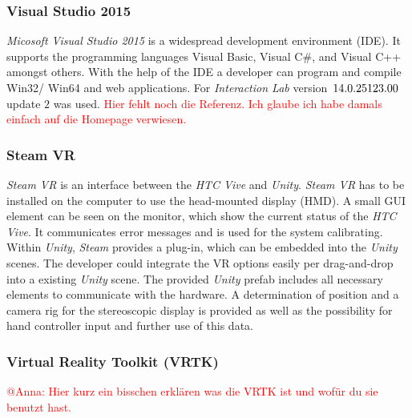 	\subsubsection{Visual Studio 2015}\label{sec:VisualStudio}
	\textit{Micosoft Visual Studio 2015} is a widespread development environment (IDE). It supports the programming languages Visual Basic, Visual C$\#$, and Visual C++ amongst others. With the help of the IDE a developer can program and compile Win32/ Win64 and web applications. For \textit{Interaction Lab} version~$14.0.\-25123.00$ update $2$ was used. \textcolor{red}{Hier fehlt noch die Referenz. Ich glaube ich habe damals einfach auf die Homepage verwiesen.}
	
	\subsubsection{Steam VR}
	\textit{Steam VR} \cite{website:steamVR} is an interface between the \textit{HTC Vive} and \textit{Unity}. \textit{Steam VR} has to be installed on the computer to use the head-mounted display (HMD). A small GUI element can be seen on the monitor, which show the current status of the \textit{HTC Vive}. It communicates error messages and is used for the system calibrating. \\
	Within \textit{Unity}, \textit{Steam} provides a plug-in, which can be embedded into the \textit{Unity} scenes. The developer could integrate the VR options easily per drag-and-drop into a existing \textit{Unity} scene. 
	The provided \textit{Unity} prefab includes all necessary elements to communicate with the hardware. A determination of position and a camera rig for the stereoscopic display is provided as well as the possibility for hand controller input and further use of this data.
	
	\subsubsection{Virtual Reality Toolkit (VRTK)}
	\textcolor{red}{@Anna: Hier kurz ein bisschen erklären was die VRTK ist und wofür du sie benutzt hast.}
	
	\newpage
